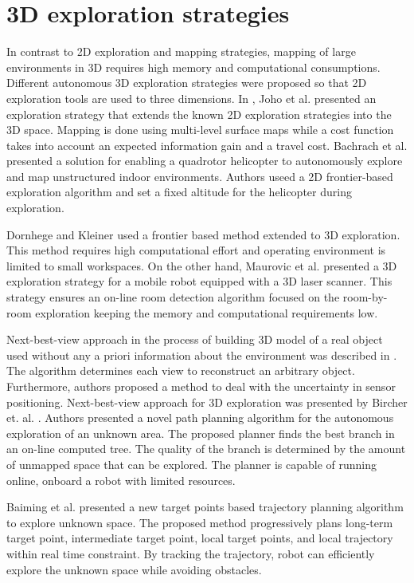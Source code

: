 \section{3D exploration strategies}

In contrast to 2D exploration and mapping strategies, mapping of large environments in 3D requires high memory and
computational consumptions. 
Different autonomous 3D exploration strategies were proposed so that 2D
exploration tools are used to three dimensions. In \cite{Joho2007}, Joho et al. presented an exploration strategy that extends the known 2D exploration strategies into the 3D space. Mapping is done using multi-level surface maps while a cost function takes
into account an expected information gain and a travel cost. 
Bachrach et
al. \cite{Bachrach2009} presented a solution for enabling a quadrotor helicopter to
autonomously explore and map unstructured indoor environments. Authors useed a 2D frontier-based
exploration algorithm and set a fixed altitude for the helicopter
during exploration.  

Dornhege and Kleiner \cite{Dornhege2013} used a frontier based method extended to 3D exploration. This method requires high computational effort and operating environment is limited
to small workspaces. On the other hand, Maurovic et al. \cite{Maurovic2014} presented a 3D exploration strategy for a mobile
robot equipped with a 3D laser scanner. This strategy ensures an on-line room detection algorithm focused on the room-by-room exploration keeping the memory and computational
requirements low.

Next-best-view approach in the process of building 3D model of a real object used without any a priori information about the environment was described in \cite{VasquezGomez2014}. The algorithm determines each view to reconstruct an arbitrary object. Furthermore, authors proposed a method to deal with the uncertainty in sensor positioning.
Next-best-view approach for 3D exploration was presented by Bircher et. al. \cite{Bircher2016}. Authors presented a novel path planning algorithm for the autonomous exploration of an unknown area. The proposed planner finds the best branch in an on-line computed tree. The quality of the branch is determined by the amount of unmapped space that
can be explored. The planner is capable of running online, onboard a robot with limited resources.

Baiming et al. \cite{Baiming2018} presented a new target points based trajectory planning algorithm to explore unknown space. The proposed method progressively plans long-term
target point, intermediate target point, local target points,
and local trajectory within real time constraint. By tracking
 the trajectory, robot can efficiently explore the unknown space while avoiding obstacles.

